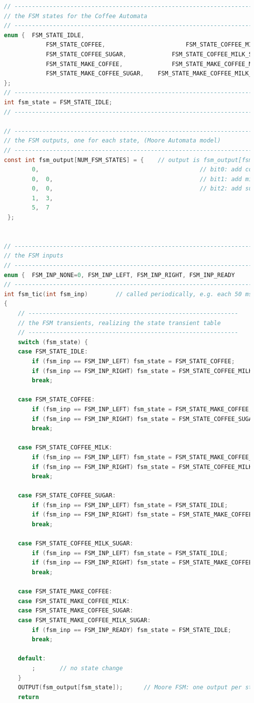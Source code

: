 \begin{lstlisting}[style=mystyle, language=c]
// ----------------------------------------------------------------------------
// the FSM states for the Coffee Automata
// ----------------------------------------------------------------------------
enum {	FSM_STATE_IDLE, 	
			FSM_STATE_COFFEE, 						FSM_STATE_COFFEE_MILK, 
			FSM_STATE_COFFEE_SUGAR, 			FSM_STATE_COFFEE_MILK_SUGAR, 
			FSM_STATE_MAKE_COFFEE, 				FSM_STATE_MAKE_COFFEE_MILK, 
			FSM_STATE_MAKE_COFFEE_SUGAR, 	FSM_STATE_MAKE_COFFEE_MILK_SUGAR, 
};
// ----------------------------------------------------------------------------
int fsm_state = FSM_STATE_IDLE;
// ----------------------------------------------------------------------------

// ----------------------------------------------------------------------------
// the FSM outputs, one for each state, (Moore Automata model)
// ----------------------------------------------------------------------------
const int fsm_output[NUM_FSM_STATES] = { 	// output is fsm_output[fsm_state]
		0,												// bit0: add coffee
		0,	0,											// bit1: add milk
		0,	0,											// bit2: add sugar
		1,	3,
		5,	7
 };


// ----------------------------------------------------------------------------
// the FSM inputs
// ----------------------------------------------------------------------------
enum {	FSM_INP_NONE=0, FSM_INP_LEFT, FSM_INP_RIGHT, FSM_INP_READY 
// ----------------------------------------------------------------------------
int fsm_tic(int fsm_inp) 		// called periodically, e.g. each 50 ms
{
	// ------------------------------------------------------------
	// the FSM transients, realizing the state transient table
	// ------------------------------------------------------------
	switch (fsm_state) {
	case FSM_STATE_IDLE:
		if (fsm_inp == FSM_INP_LEFT) fsm_state = FSM_STATE_COFFEE;
		if (fsm_inp == FSM_INP_RIGHT) fsm_state = FSM_STATE_COFFEE_MILK;
		break;
		
	case FSM_STATE_COFFEE:
		if (fsm_inp == FSM_INP_LEFT) fsm_state = FSM_STATE_MAKE_COFFEE;
		if (fsm_inp == FSM_INP_RIGHT) fsm_state = FSM_STATE_COFFEE_SUGAR;
		break;

	case FSM_STATE_COFFEE_MILK:
		if (fsm_inp == FSM_INP_LEFT) fsm_state = FSM_STATE_MAKE_COFFEE_MILK;
		if (fsm_inp == FSM_INP_RIGHT) fsm_state = FSM_STATE_COFFEE_MILK_SUGAR;
		break;

	case FSM_STATE_COFFEE_SUGAR:
		if (fsm_inp == FSM_INP_LEFT) fsm_state = FSM_STATE_IDLE;
		if (fsm_inp == FSM_INP_RIGHT) fsm_state = FSM_STATE_MAKE_COFFEE_SUGAR;
		break;

	case FSM_STATE_COFFEE_MILK_SUGAR:
		if (fsm_inp == FSM_INP_LEFT) fsm_state = FSM_STATE_IDLE;
		if (fsm_inp == FSM_INP_RIGHT) fsm_state = FSM_STATE_MAKE_COFFEE_MILK_SUGAR;
		break;

	case FSM_STATE_MAKE_COFFEE:
	case FSM_STATE_MAKE_COFFEE_MILK:
	case FSM_STATE_MAKE_COFFEE_SUGAR:
	case FSM_STATE_MAKE_COFFEE_MILK_SUGAR:
		if (fsm_inp == FSM_INP_READY) fsm_state = FSM_STATE_IDLE;
		break;

	default:
		;		// no state change
	}
	OUTPUT(fsm_output[fsm_state]);		// Moore FSM: one output per state
	return 
\end{lstlisting}

